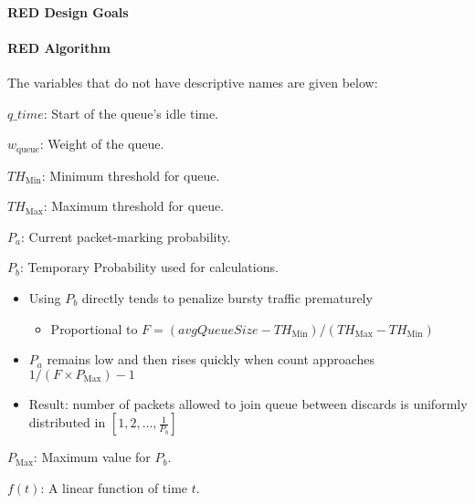 \paragraph{RED Design Goals}\label{par:Random_Early_Discard_Design_Goals}
\paragraph{RED Algorithm}\label{par:Random_Early_Discard_Algorithm}
The variables that do not have descriptive names are given below:
\begin{description}[noitemsep]
\item $q\_time$: Start of the queue's idle time.
\item $w_{\mathrm{queue}}$: Weight of the queue.
\item $TH_{\mathrm{Min}}$: Minimum threshold for queue.
\item $TH_{\mathrm{Max}}$: Maximum threshold for queue.
\item $P_{a}$: Current packet-marking probability.
\item $P_{b}$: Temporary Probability used for calculations.
  \begin{itemize}[noitemsep]
  \item Using $P_{b}$ directly tends to penalize bursty traffic prematurely
    \begin{itemize}[noitemsep]
    \item Proportional to $F=(avgQueueSize-TH_{\mathrm{Min}})/(TH_{\mathrm{Max}}-TH_{\mathrm{Min}})$
    \end{itemize}
\item $P_{a}$ remains low and then rises quickly when count approaches $1/(F \times P_{\mathrm{Max}})-1$
\item Result: number of packets allowed to join queue between discards is uniformly distributed in $\left[1, 2, \ldots, \frac{1}{P_{b}} \right]$
  \end{itemize}
\item $P_{\mathrm{Max}}$: Maximum value for $P_{b}$.
\item $f(t)$: A linear function of time $t$.
\end{description}

